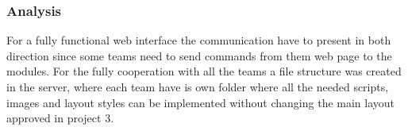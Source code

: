 \subsubsection{Analysis}
%
%
For a fully functional web interface the communication have to present in both direction since some teams need to send commands from them web page to the modules.
For the fully cooperation with all the teams a file structure was created in the server, where each team have is own folder where all the needed scripts, images and layout styles can be implemented without changing the main layout approved in project 3.
